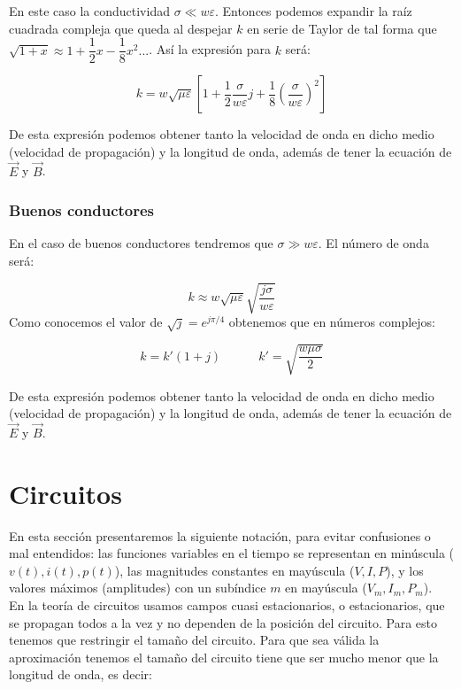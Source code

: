 \documentclass[12pt]{article}
\newcommand{\tquad}{\quad \quad \quad}
\begin{document}
En este caso la conductividad $\sigma \ll w \varepsilon$. Entonces podemos expandir la raíz cuadrada compleja que queda al despejar $k$ en serie de Taylor de tal forma que $\sqrt{1+x} \approx 1+ \dfrac{1}{2} x - \dfrac{1}{8} x^2...$. Así la expresión para $k$ será:

\begin{equation}
k = w \sqrt{\mu \varepsilon} \left[ 1 + \dfrac{1}{2} \dfrac{\sigma}{w \varepsilon} j + \dfrac{1}{8} (\dfrac{\sigma}{w \varepsilon})^2 \right]
\end{equation}

De esta expresión podemos obtener tanto la velocidad de onda en dicho medio (velocidad de propagación) y la longitud de onda, además de tener la ecuación de $\vec{E}$ y $\vec{B}$.

\subsubsection{Buenos conductores}

En el caso de buenos conductores tendremos que $\sigma \gg w \varepsilon$. El número de onda será:

\begin{equation}
k \approx w \sqrt{\mu \varepsilon} \sqrt{\dfrac{j \sigma}{w \varepsilon}}
\end{equation}
Como conocemos el valor de $\sqrt{j} = e^{j \pi/4}$ obtenemos que en números complejos:

\begin{equation}
k = k' (1+j) \tquad k' = \sqrt{ \dfrac{w \mu \sigma }{2}}
\end{equation}

De esta expresión podemos obtener tanto la velocidad de onda en dicho medio (velocidad de propagación) y la longitud de onda, además de tener la ecuación de $\vec{E}$ y $\vec{B}$.
\newpage

\section{Circuitos}

En esta sección presentaremos la siguiente notación, para evitar confusiones o mal entendidos: las funciones variables en el tiempo se representan en minúscula ($v(t), i(t),p(t)$), las magnitudes constantes en mayúscula ($V,I,P$), y los valores máximos (amplitudes) con un subíndice $m$ en mayúscula ($V_m,I_m,P_m$). \\

En la teoría de circuitos usamos campos cuasi estacionarios, o estacionarios, que se propagan todos a la vez y no dependen de la posición del circuito. Para esto tenemos que restringir el tamaño del circuito. Para que sea válida la aproximación tenemos el tamaño del circuito tiene que ser mucho menor que la longitud de onda, es decir:
\end{document}
